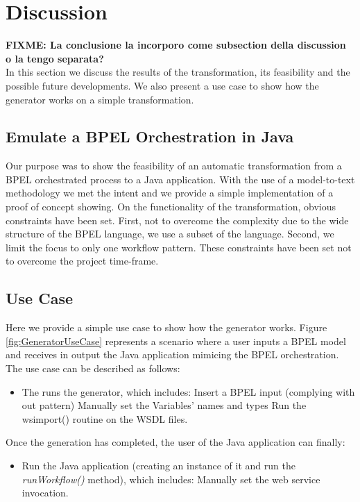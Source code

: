 \section{Discussion}
\label{Discussion}
\textbf{FIXME: La conclusione la incorporo come subsection della discussion o la tengo separata? }\\
In this section we discuss the results of the transformation, its feasibility and the possible future developments. We also present a use case to show how the generator works on a simple transformation.
\subsection{Emulate a BPEL Orchestration in Java}
\label{sec:OrchestrEmulation}
Our purpose was to show the feasibility of an automatic transformation from a BPEL orchestrated process to a Java application. With the use of a model-to-text methodology we met the intent and we provide a simple implementation of a proof of concept showing.
On the functionality of the transformation, obvious constraints have been set. First, not to overcome the complexity due to the wide structure of the BPEL language, we use a subset of the language. Second, we limit the focus to only one workflow pattern. 
These constraints have been set not to overcome the project time-frame.


\subsection{Use Case}
\label{sec:UseCase}
Here we provide a simple use case to show how the generator works. Figure \ref{fig:GeneratorUseCase} represents a scenario where a user inputs a BPEL model and receives in output the Java application mimicing the BPEL orchestration.
The use case can be described as follows:
\begin{itemize}
 \item The runs the generator, which includes:
  \subitem Insert a BPEL input (complying with out pattern) 
  \subitem Manually set the Variables' names and types
  \subitem Run the wsimport() routine on the WSDL files.
\end{itemize}
Once the generation has completed, the user of the Java application can finally:
\begin{itemize} 
 \item Run the Java application (creating an instance of it and run the \textit{runWorkflow()} method), which includes:
  \subitem Manually set the web service invocation.
\end{itemize}

